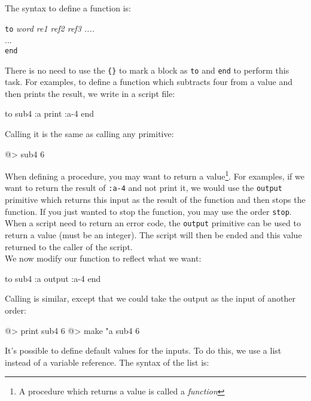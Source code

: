 The syntax to define a function is:\newline
 
{\tt to} {\it word re1 ref2 ref3 ....}\\ 
...\\ 
{\tt end}\newline 
 
There is no need to use the {\tt \{\}} to mark a block as {\tt to} and {\tt end} to perform this task. For examples, to define a function which subtracts four from a value and then prints the result, we write in a script file:
 
\begin{verbatimtab}
to sub4 :a 
	print :a-4 
end 
\end{verbatimtab}
 
Calling it is the same as calling any primitive:
 
\begin{verbatimtab}
@> sub4 6 
\end{verbatimtab}
 
When defining a procedure, you may want to return a value\footnote{A procedure which returns a value is called a {\em function}}.  For examples, if we want to return the result of {\tt :a-4} and not print it, we would use the {\tt output} primitive which returns this input as the result of the function and then stops the function. If you just wanted to stop the function, you may use the order {\tt stop}.\\

When a script need to return an error code, the {\tt output} primitive can be
used to return a value (must be an integer). The script will then be ended and
this value returned to the caller of the script.\\  

We now modify our function to reflect what we want: 
 
\begin{verbatimtab}  
to sub4 :a 
	output :a-4
end 
\end{verbatimtab}
 
Calling is similar, except that we could take the output as the input of another order: 
 
\begin{verbatimtab}
@> print sub4 6 
@> make "a sub4 6 
\end{verbatimtab}
 
It's possible to define default values for the inputs. To do this, we use a list instead of a variable reference. The syntax of the list is: 
 
